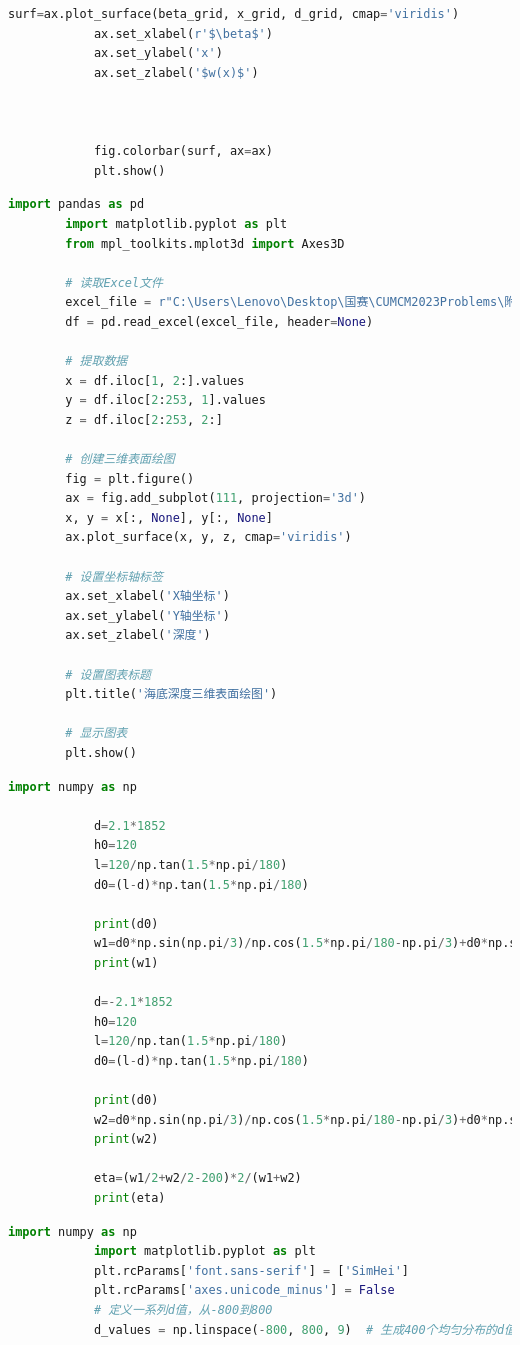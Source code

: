 \documentclass[withoutpreface,bwprint]{cumcmthesis} %
\begin{document}
\begin{appendices}
\begin{lstlisting}[language=Python]
            surf=ax.plot_surface(beta_grid, x_grid, d_grid, cmap='viridis')
            ax.set_xlabel(r'$\beta$')
            ax.set_ylabel('x')
            ax.set_zlabel('$w(x)$')



            fig.colorbar(surf, ax=ax)
            plt.show()


        \end{lstlisting}
        \begin{lstlisting}[language=Python]
                    import pandas as pd
        import matplotlib.pyplot as plt
        from mpl_toolkits.mplot3d import Axes3D

        # 读取Excel文件
        excel_file = r"C:\Users\Lenovo\Desktop\国赛\CUMCM2023Problems\附件.xlsx"
        df = pd.read_excel(excel_file, header=None)

        # 提取数据
        x = df.iloc[1, 2:].values
        y = df.iloc[2:253, 1].values
        z = df.iloc[2:253, 2:]

        # 创建三维表面绘图
        fig = plt.figure()
        ax = fig.add_subplot(111, projection='3d')
        x, y = x[:, None], y[:, None]
        ax.plot_surface(x, y, z, cmap='viridis')

        # 设置坐标轴标签
        ax.set_xlabel('X轴坐标')
        ax.set_ylabel('Y轴坐标')
        ax.set_zlabel('深度')

        # 设置图表标题
        plt.title('海底深度三维表面绘图')

        # 显示图表
        plt.show()
        \end{lstlisting}
        \begin{lstlisting}[language=Python]
            import numpy as np

            d=2.1*1852
            h0=120
            l=120/np.tan(1.5*np.pi/180)
            d0=(l-d)*np.tan(1.5*np.pi/180)
            
            print(d0)
            w1=d0*np.sin(np.pi/3)/np.cos(1.5*np.pi/180-np.pi/3)+d0*np.sin(np.pi/3)/np.cos(1.5*np.pi/180+np.pi/3)
            print(w1)
            
            d=-2.1*1852
            h0=120
            l=120/np.tan(1.5*np.pi/180)
            d0=(l-d)*np.tan(1.5*np.pi/180)
            
            print(d0)
            w2=d0*np.sin(np.pi/3)/np.cos(1.5*np.pi/180-np.pi/3)+d0*np.sin(np.pi/3)/np.cos(1.5*np.pi/180+np.pi/3)
            print(w2)
            
            eta=(w1/2+w2/2-200)*2/(w1+w2)
            print(eta)
        \end{lstlisting}    
        \begin{lstlisting}[language=Python]
            import numpy as np
            import matplotlib.pyplot as plt
            plt.rcParams['font.sans-serif'] = ['SimHei']
            plt.rcParams['axes.unicode_minus'] = False
            # 定义一系列d值，从-800到800
            d_values = np.linspace(-800, 800, 9)  # 生成400个均匀分布的d值
            

\end{lstlisting}
\end{appendices}
\end{document}
